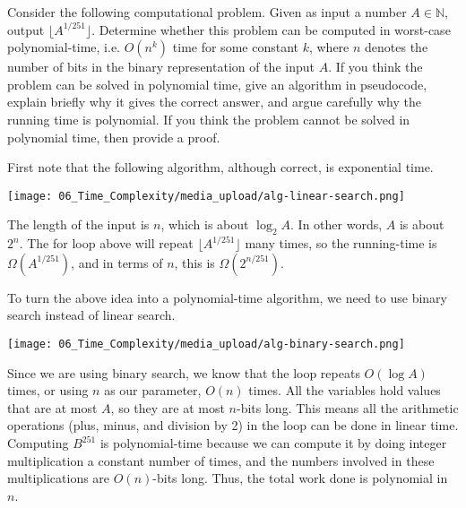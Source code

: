 \begin{flex}
\begin{exercise} [$251$st root] \label{exercise:251st-root}
Consider the following computational problem. Given as input a number $A \in \mathbb{N}$, output $\lfloor A^{1/251}\rfloor$. Determine whether this problem can be computed in worst-case polynomial-time, i.e. $O(n^k)$ time for some constant $k$, where $n$ denotes the number of bits in the binary representation of the input $A$. If you think the problem can be solved in polynomial time, give an algorithm in pseudocode, explain briefly why it gives the correct answer, and argue carefully why the running time is polynomial. If you think the problem cannot be solved in polynomial time, then provide a proof.
\end{exercise}


\begin{solution}
First note that the following algorithm, although correct, is exponential time.

\begin{center}
\texttt{[image: 06\_Time\_Complexity/media\_upload/alg-linear-search.png]}
\end{center}

The length of the input is $n$, which is about $\log_2 A$. In other words, $A$ is about $2^n$. The for loop above will repeat $\lfloor A^{1/251} \rfloor$ many times, so the running-time is $\Omega(A^{1/251})$, and in terms of $n$, this is $\Omega(2^{n/251})$.

To turn the above idea into a polynomial-time algorithm, we need to use binary search instead of linear search.

\begin{center}
\texttt{[image: 06\_Time\_Complexity/media\_upload/alg-binary-search.png]}
\end{center}

Since we are using binary search, we know that the loop repeats $O(\log A)$ times, or using $n$ as our parameter, $O(n)$ times. All the variables hold values that are at most $A$, so they are at most $n$-bits long. This means all the arithmetic operations (plus, minus, and division by 2) in the loop can be done in linear time. Computing $B^{251}$ is polynomial-time because we can compute it by doing integer multiplication a constant number of times, and the numbers involved in these multiplications are $O(n)$-bits long. Thus, the total work done is polynomial in $n$.
\end{solution}
\end{flex}



